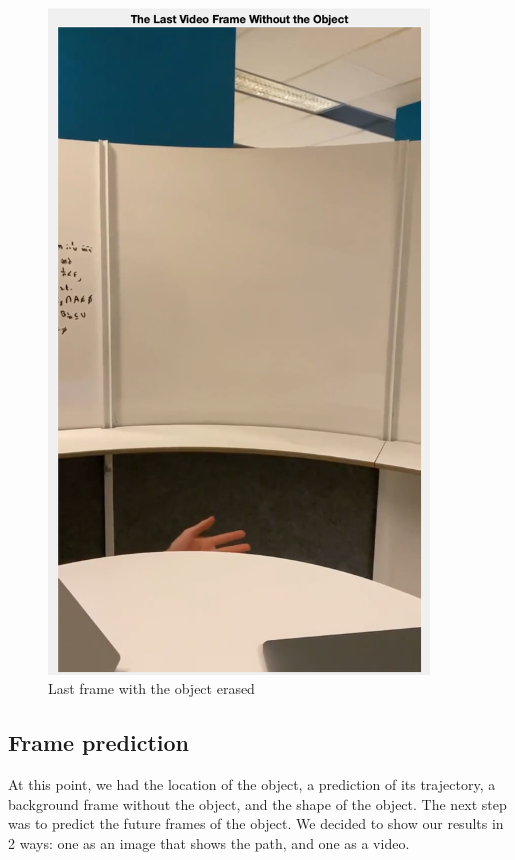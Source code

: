 \documentclass[12pt]{article}
\begin{document}
\begin{figure}[h]
\begin{minipage}{0.45\textwidth}
        \includegraphics[width=0.9\textwidth]{figures/bg1.png}
        \caption{Last frame with the object erased}
    \end{minipage}
\end{figure}
\clearpage

\subsection*{Frame prediction}
At this point, we had the location of the object, a prediction of its trajectory, a background frame without the object, and the shape of the object. The next step was to predict the future frames of the object. We decided to show our results in 2 ways: one as an image that shows the path, and one as a video.
\end{document}
